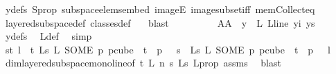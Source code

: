 \begin{isabellebody}
\ ydefs\ S{\isacharunderscore}{\kern0pt}prop\ subspace{\isacharunderscore}{\kern0pt}elems{\isacharunderscore}{\kern0pt}embed\ imageE\ image{\isacharunderscore}{\kern0pt}subset{\isacharunderscore}{\kern0pt}iff\ mem{\isacharunderscore}{\kern0pt}Collect{\isacharunderscore}{\kern0pt}eq\ \isamarkupfalse%
\ layered{\isacharunderscore}{\kern0pt}subspace{\isacharunderscore}{\kern0pt}def\ classes{\isacharunderscore}{\kern0pt}def\ \ \isamarkupfalse%
\ blast\isanewline
\ \ \ \ \ \ \isamarkupfalse%
\ \isamarkupfalse%
\ AA{}{\isacharcolon}{\kern0pt}\ {\isachardoublequoteopen}{\isasymchi}\ y\ {\isacharequal}{\kern0pt}\ {\isasymchi}L\ {\isacharparenleft}{\kern0pt}L{\isacharunderscore}{\kern0pt}line\ yi{\isacharparenright}{\kern0pt}\ ys{\isachardoublequoteclose}\ \isamarkupfalse%
\ ydefs\ \isamarkupfalse%
\ {\isasymchi}L{\isacharunderscore}{\kern0pt}def\ \isamarkupfalse%
\ simp\isanewline
\isanewline
\ \ \ \ \ \ \isamarkupfalse%
\ {\isachardoublequoteopen}{\isasymforall}s{\isacharless}{\kern0pt}t{\isachardot}{\kern0pt}\ {\isasymforall}l\ {\isacharless}{\kern0pt}\ t{\isachardot}{\kern0pt}\ {\isasymchi}L{\isacharunderscore}{\kern0pt}s\ {\isacharparenleft}{\kern0pt}L\ {\isacharparenleft}{\kern0pt}SOME\ p{\isachardot}{\kern0pt}\ p{\isasymin}cube\ {}\ {\isacharparenleft}{\kern0pt}t{\isacharplus}{\kern0pt}{}{\isacharparenright}{\kern0pt}\ {\isasymand}\ p\ {}\ {\isacharequal}{\kern0pt}\ s{\isacharparenright}{\kern0pt}{\isacharparenright}{\kern0pt}\ {\isacharequal}{\kern0pt}\ {\isasymchi}L{\isacharunderscore}{\kern0pt}s\ {\isacharparenleft}{\kern0pt}L\ {\isacharparenleft}{\kern0pt}SOME\ p{\isachardot}{\kern0pt}\ p{\isasymin}cube\ {}\ {\isacharparenleft}{\kern0pt}t{\isacharplus}{\kern0pt}{}{\isacharparenright}{\kern0pt}\ {\isasymand}\ p\ {}\ {\isacharequal}{\kern0pt}\ l{\isacharparenright}{\kern0pt}{\isacharparenright}{\kern0pt}{\isachardoublequoteclose}\ \isamarkupfalse%
\ dim{}{\isacharunderscore}{\kern0pt}layered{\isacharunderscore}{\kern0pt}subspace{\isacharunderscore}{\kern0pt}mono{\isacharunderscore}{\kern0pt}line{\isacharbrackleft}{\kern0pt}of\ t\ L\ n\ s\ {\isasymchi}L{\isacharunderscore}{\kern0pt}s{\isacharbrackright}{\kern0pt}\ L{\isacharunderscore}{\kern0pt}prop\ assms{\isacharparenleft}{\kern0pt}{}{\isacharparenright}{\kern0pt}\ \isamarkupfalse%
\ blast\isanewline
\ \ \ \ \ \ \isamarkupfalse%

\end{isabellebody}
